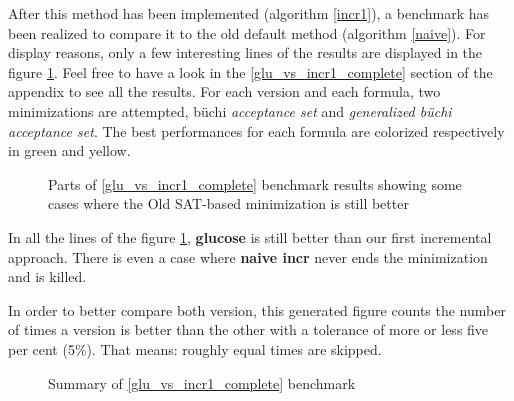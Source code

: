 \noindent After this method has been implemented (algorithm \ref{incr1}), a benchmark has been realized to
compare it to the old default method (algorithm \ref{naive}). For display reasons, only a few interesting
lines of the results are displayed in the figure \ref{fig:glu_vs_incr1_short}. Feel free to have a look
in the \ref{glu_vs_incr1_complete} section of the appendix to see all the results. For each version and
each formula, two minimizations are attempted, büchi \textit{acceptance set} and
\textit{generalized büchi acceptance set}. The best performances for each formula are colorized
respectively in green and yellow.

\begin{figure}[H]
 \centering
 \fontsize{9}{11}
 \caption{Parts of \ref{glu_vs_incr1_complete} benchmark results showing some cases where the Old SAT-based
          minimization is still better}
 \label{fig:glu_vs_incr1_short}
\end{figure}

In all the lines of the figure \ref{fig:glu_vs_incr1_short}, \textbf{glucose} is still better than our first
incremental approach. There is even a case where \textbf{naive incr} never ends the minimization and
is killed.

In order to better compare both version, this generated figure counts the number of times a version is
better than the other with a tolerance of more or less five per cent (5\%). That means: roughly equal times
are skipped.
\begin{figure}[H]
 \centering
 
 \caption{Summary of \ref{glu_vs_incr1_complete} benchmark}
 \label{fig:glu_vs_incr1_resume}
\end{figure}

